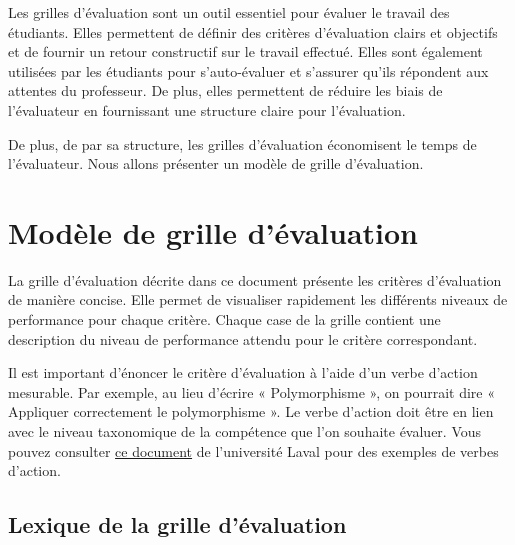 \documentclass[letterpaper, 12pt]{article}
\begin{document}
Les grilles d'évaluation sont un outil essentiel pour évaluer le travail des
étudiants. Elles permettent de définir des critères d'évaluation clairs et
objectifs et de fournir un retour constructif sur le travail effectué. Elles
sont également utilisées par les étudiants pour s'auto-évaluer et s'assurer
qu'ils répondent aux attentes du professeur. De plus, elles permettent de
réduire les biais de l'évaluateur en fournissant une structure claire pour
l'évaluation.

De plus, de par sa structure, les grilles d'évaluation économisent le temps de
l'évaluateur. Nous allons présenter un modèle de grille d'évaluation.

\section{Modèle de grille d'évaluation}

La grille d'évaluation décrite dans ce document présente les critères
d'évaluation de manière concise. Elle permet de visualiser rapidement les
différents niveaux de performance pour chaque critère. Chaque case de la grille
contient une description du niveau de performance attendu pour le critère
correspondant.

Il est important d'énoncer le critère d'évaluation à l'aide d'un verbe d'action
mesurable. Par exemple, au lieu d'écrire « Polymorphisme », on
pourrait dire « Appliquer correctement le polymorphisme ». Le verbe d'action
doit être en lien avec le niveau taxonomique de la compétence que l'on souhaite
évaluer. Vous pouvez consulter 
\href{https://www.enseigner.ulaval.ca/system/files/public/pedagogie/preparer-votre-cours/taxonomie-de-bloom-revisee.pdf}
{ce document} de l'université Laval pour des exemples de verbes d'action.

\subsection{Lexique de la grille d'évaluation}
\end{document}
